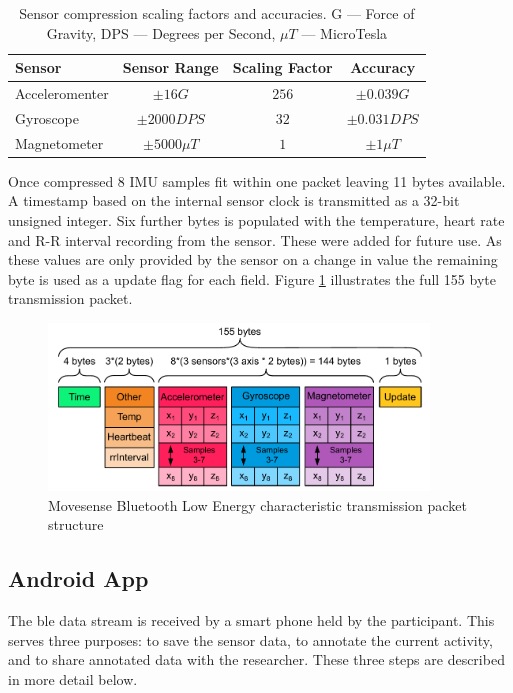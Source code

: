 \begin{table}[!hbt]
    \centering
    \caption[Sensor compression scaling factors and accuracies]{Sensor compression scaling factors and accuracies. G --- Force of Gravity, DPS --- Degrees per Second, $\mu T$ --- MicroTesla}
    \label{tab:methods-imu-data-compression-factors}
    
    \begin{tabular}{l|ccc}
         \textbf{Sensor} & \textbf{Sensor Range} & \textbf{Scaling Factor} & \textbf{Accuracy} \\
         \hline
         Acceleromenter & $\pm16 G$ & $256$ & $\pm0.039 G$  \\
         Gyroscope & $\pm2000 DPS$ & $32$ & $\pm0.031 DPS$  \\
         Magnetometer & $\pm5000\mu T$ & $1$ & $\pm1\mu T$
    \end{tabular}
\end{table}

Once compressed 8 IMU samples fit within one packet leaving 11 bytes available. A timestamp based on the internal sensor clock is transmitted as a 32-bit unsigned integer. Six further bytes is populated with the temperature, heart rate and R-R interval recording from the sensor. These were added for future use. As these values are only provided by the sensor on a change in value the remaining byte is used as a update flag for each field. Figure \ref{fig:methods-ble-packet-structure} illustrates the full 155 byte transmission packet.

\begin{figure}[!hbt]
    \centering
    \includegraphics[width=0.9\textwidth]{content/3-Methods/BLE_Bytes_Packets.pdf}
    \caption[Movesense data packet structure]{Movesense Bluetooth Low Energy characteristic transmission packet structure}
    \label{fig:methods-ble-packet-structure}
\end{figure}

\subsection{Android App}
The \acrshort{ble} data stream is received by a smart phone held by the participant. This serves three purposes: to save the sensor data, to annotate the current activity, and to share annotated data with the researcher. These three steps are described in more detail below. 

